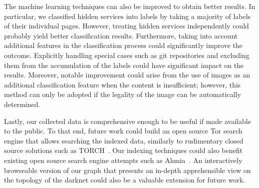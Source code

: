 The machine learning techniques can also be improved to obtain better results. In particular, we classified hidden services into labels by taking a majority of labels of their individual pages. However, treating hidden services independently could probably yield better classification results.  
Furthermore, taking into account additional features in the classification process could significantly improve the outcome. Explicitly handling special cases such as git repositories and excluding them from the accumulation of the labels could have significant impact on the results. Moreover, notable improvement could arise from the use of images as an additional classification feature when the content is insufficient; however, this method can only be adopted if the legality of the image can be automatically determined.

Lastly, our collected data is comprehensive enough to be useful if made available to the public. To that end, future work could build an open source Tor search engine that allows searching the indexed data, similarly to rudimentary closed source solutions such as TORCH~\cite{torch}. Our indexing techniques could also benefit existing open source search engine attempts such as Ahmia~\cite{ahmia}. An interactively browseable version of our graph that presents an in-depth apprehensible view on the topology of the darknet could also be a valuable extension for future work.
